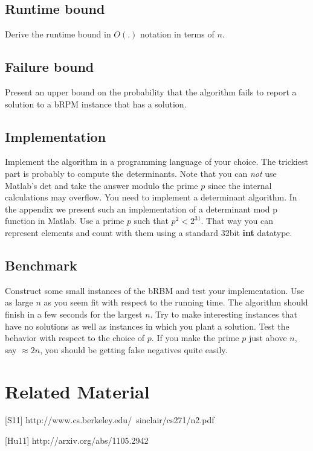 \documentclass{tufte-handout}
\begin{document}
\subsection*{Runtime bound}
Derive the runtime bound in $O(.)$ notation in terms of $n$.
\subsection*{Failure bound}
Present an upper bound on the probability that the algorithm fails to report a solution to a bRPM instance that has a solution.
\subsection*{Implementation}
Implement the algorithm in a programming language of your choice. The trickiest part is probably to compute the determinants. Note that you can \emph{not} use Matlab's det and take the answer modulo the prime $p$ since the internal calculations may overflow. You need to implement a determinant algorithm.
In the appendix we present such an implementation of a determinant mod p function in Matlab.
Use a prime $p$ such that $p^2<2^{31}$. That way you can represent elements and count with them using a standard 32bit \textbf{int} datatype.

\subsection*{Benchmark}
Construct some small instances of the bRBM and test your implementation. Use as large $n$ as you seem fit with respect to the running time. The algorithm should finish in a few seconds for the largest $n$.  Try to make interesting instances that have no solutions as well as instances in which you plant a solution. Test the behavior with respect to the choice of $p$. If you make the prime $p$ just above $n$, say $\approx 2n$,  you should be getting false negatives quite easily.

\section*{Related Material}
[S11] http://www.cs.berkeley.edu/~sinclair/cs271/n2.pdf

[Hu11] http://arxiv.org/abs/1105.2942

\newpage
\end{document}
